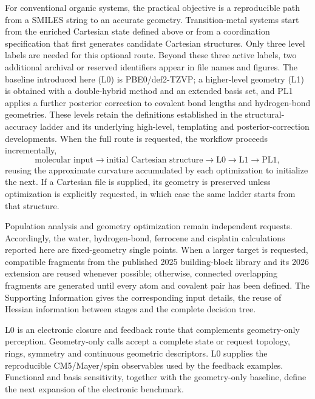 \documentclass[journal=jctcce,manuscript=article]{achemso}
\newcommand{\rev}[1]{#1}
\begin{document}
For conventional organic systems, the practical objective is a reproducible
path from a SMILES string to an accurate geometry.  Transition-metal systems
start from the enriched Cartesian state defined above or from a coordination
specification that first generates candidate Cartesian structures.  Only three level labels are needed for this optional
route.  Beyond these three active labels, two additional archival or reserved
identifiers appear in file names and figures.  The baseline introduced here
(L0) is PBE0/def2-TZVP; a higher-level
geometry (L1) is obtained with a double-hybrid method and an extended basis set, and PL1
applies a further posterior correction to covalent bond lengths and
hydrogen-bond geometries.  These levels retain the definitions established in
the structural-accuracy ladder and its underlying high-level, templating and
posterior-correction developments.
\cite{acr_2026,external_MRCC_2025,PCS141_2024,synthon_2024,DPCS3_2023}
When the full route is requested, the workflow proceeds incrementally,
\begin{equation}
\text{molecular input}\longrightarrow
\text{initial Cartesian structure}\longrightarrow
\mathrm{L0}\longrightarrow\mathrm{L1}\longrightarrow\mathrm{PL1},
\label{eq:geometry-ladder}
\end{equation}
reusing the approximate curvature accumulated by each optimization to
initialize the next.  If a Cartesian file is supplied, its geometry is
preserved unless optimization is explicitly requested, in which case the same
ladder starts from that structure.

Population analysis and geometry optimization remain independent requests.
Accordingly, the water, hydrogen-bond, ferrocene and cisplatin calculations
reported here are fixed-geometry single points.  When a larger target is
requested, compatible fragments from the published 2025 building-block
library and its 2026 extension are reused whenever possible; otherwise,
connected overlapping fragments are generated until every atom and covalent
pair has been defined.  The Supporting Information gives the corresponding
input details, the reuse of Hessian information between stages and the
complete decision tree.

\rev{L0 is an electronic closure and feedback route that complements
geometry-only perception.  Geometry-only calls accept a complete state or
request topology, rings, symmetry and continuous geometric descriptors.  L0
supplies the reproducible CM5/Mayer/spin observables used by the feedback
examples.  Functional and basis sensitivity, together with the geometry-only
baseline, define the next expansion of the electronic benchmark.}
\end{document}
